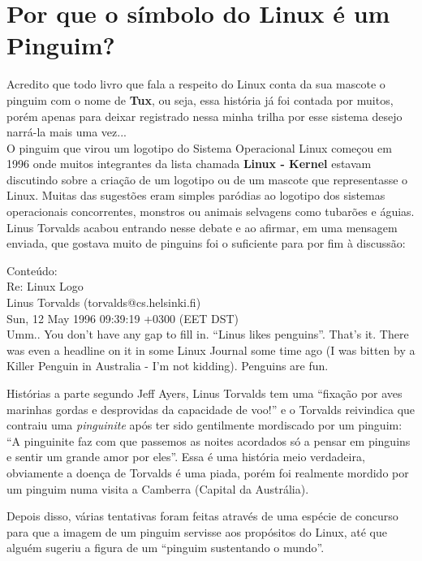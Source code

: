 \section{Por que o símbolo do Linux é um Pinguim?}
Acredito que todo livro que fala a respeito do Linux conta da sua mascote o pinguim com o nome de \textbf{Tux}, ou seja, essa história já foi contada por muitos, porém apenas para deixar registrado nessa minha trilha por esse sistema desejo narrá-la mais uma vez... \\[3mm]
O pinguim que virou um logotipo do Sistema Operacional Linux começou em 1996 onde muitos integrantes da lista chamada \textbf{Linux - Kernel} estavam discutindo sobre a criação de um logotipo ou de um mascote que representasse o Linux. Muitas das sugestões eram simples paródias ao logotipo dos sistemas operacionais concorrentes, monstros ou animais selvagens como tubarões e águias. Linus Torvalds acabou entrando nesse debate e ao afirmar, em uma mensagem enviada, que gostava muito de pinguins foi o suficiente para por fim à discussão:
\\[3mm]
\begin{theorem} Conteúdo: \\
Re: Linux Logo \\
Linus Torvalds (torvalds@cs.helsinki.fi) \\ 
Sun, 12 May 1996 09:39:19 +0300 (EET DST) \\ 
Umm.. You don't have any gap to fill in.
``Linus likes penguins''. That's it. There was even a headline on it in some Linux Journal some time ago (I was bitten by a Killer Penguin in Australia - I'm not kidding). Penguins are fun.
\end{theorem}

Histórias a parte segundo Jeff Ayers, Linus Torvalds tem uma ``fixação por aves marinhas gordas e desprovidas da capacidade de voo!'' e o Torvalds reivindica que contraiu uma \textit{pinguinite} após ter sido gentilmente mordiscado por um pinguim: ``A pinguinite faz com que passemos as noites acordados só a pensar em pinguins e sentir um grande amor por eles''. Essa é uma história meio verdadeira, obviamente a doença de Torvalds é uma piada, porém foi realmente mordido por um pinguim numa visita a Camberra (Capital da Austrália).

Depois disso, várias tentativas foram feitas através de uma espécie de concurso para que a imagem de um pinguim servisse aos propósitos do Linux, até que alguém sugeriu a figura de um ``pinguim sustentando o mundo''.


